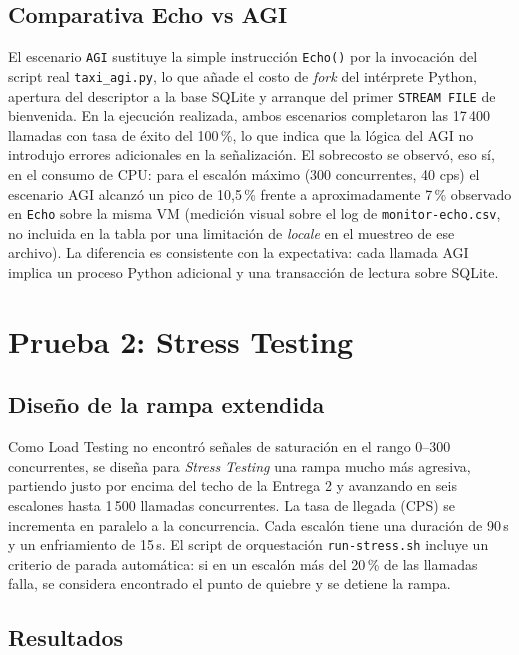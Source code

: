 \documentclass[conference]{IEEEtran}
\begin{document}
\subsection{Comparativa Echo vs AGI}

El escenario \texttt{AGI} sustituye la simple instrucci\'on
\texttt{Echo()} por la invocaci\'on del script real
\texttt{taxi\_agi.py}, lo que a\~nade el costo de \textit{fork} del
int\'erprete Python, apertura del descriptor a la base SQLite y
arranque del primer \texttt{STREAM FILE} de bienvenida. En la
ejecuci\'on realizada, ambos escenarios completaron las 17\,400
llamadas con tasa de \'exito del 100\,\%, lo que indica que la l\'ogica
del AGI no introdujo errores adicionales en la se\~nalizaci\'on. El
sobrecosto se observ\'o, eso s\'i, en el consumo de CPU: para el
escal\'on m\'aximo (300 concurrentes, 40 cps) el escenario AGI alcanz\'o
un pico de 10{,}5\,\% frente a aproximadamente 7\,\% observado en
\texttt{Echo} sobre la misma VM (medici\'on visual sobre el log de
\texttt{monitor-echo.csv}, no incluida en la tabla por una limitaci\'on
de \textit{locale} en el muestreo de ese archivo). La diferencia es
consistente con la expectativa: cada llamada AGI implica un proceso
Python adicional y una transacci\'on de lectura sobre SQLite.

\FloatBarrier
\section{Prueba 2: Stress Testing}
\label{sec:stress}

\subsection{Dise\~no de la rampa extendida}

Como Load Testing no encontr\'o se\~nales de saturaci\'on en el rango
0--300 concurrentes, se dise\~na para \textit{Stress Testing} una rampa
mucho m\'as agresiva, partiendo justo por encima del techo de la
Entrega 2 y avanzando en seis escalones hasta 1\,500 llamadas
concurrentes. La tasa de llegada (CPS) se incrementa en paralelo a la
concurrencia. Cada escal\'on tiene una duraci\'on de 90\,s y un
enfriamiento de 15\,s. El script de orquestaci\'on
\texttt{run-stress.sh} incluye un criterio de parada autom\'atica: si
en un escal\'on m\'as del 20\,\% de las llamadas falla, se considera
encontrado el punto de quiebre y se detiene la rampa.

\subsection{Resultados}
\end{document}
